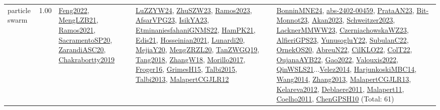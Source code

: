 {\begin{longtable}{p{3cm}r>{\raggedright\arraybackslash}p{6cm}>{\raggedright\arraybackslash}p{6cm}>{\raggedright\arraybackslash}p{8cm}}
\index{particle swarm}\index{Algorithms!particle swarm}particle swarm &  1.00 & \hyperref[detail:Feng2022]{Feng2022}, \hyperref[detail:MengLZB21]{MengLZB21}, \hyperref[detail:Ramos2021]{Ramos2021}, \hyperref[detail:SacramentoSP20]{SacramentoSP20}, \hyperref[detail:ZarandiASC20]{ZarandiASC20}, \hyperref[detail:Chakrabortty2019]{Chakrabortty2019} & \hyperref[detail:LuZZYW24]{LuZZYW24}, \hyperref[detail:ZhuSZW23]{ZhuSZW23}, \hyperref[detail:Ramos2023]{Ramos2023}, \hyperref[detail:AfsarVPG23]{AfsarVPG23}, \hyperref[detail:IsikYA23]{IsikYA23}, \hyperref[detail:EtminaniesfahaniGNMS22]{EtminaniesfahaniGNMS22}, \hyperref[detail:HamPK21]{HamPK21}, \hyperref[detail:Edis21]{Edis21}, \hyperref[detail:Hosseinian2021]{Hosseinian2021}, \hyperref[detail:Lunardi20]{Lunardi20}, \hyperref[detail:MejiaY20]{MejiaY20}, \hyperref[detail:MengZRZL20]{MengZRZL20}, \hyperref[detail:TanZWGQ19]{TanZWGQ19}, \hyperref[detail:Tang2018]{Tang2018}, \hyperref[detail:ZhangW18]{ZhangW18}, \hyperref[detail:Morillo2017]{Morillo2017}, \hyperref[detail:Froger16]{Froger16}, \hyperref[detail:GrimesH15]{GrimesH15}, \hyperref[detail:Talbi2015]{Talbi2015}, \hyperref[detail:Talbi2013]{Talbi2013}, \hyperref[detail:MalapertCGJLR12]{MalapertCGJLR12} & \hyperref[detail:BonninMNE24]{BonninMNE24}, \hyperref[detail:abs-2402-00459]{abs-2402-00459}, \hyperref[detail:PrataAN23]{PrataAN23}, \hyperref[detail:Bit-Monnot23]{Bit-Monnot23}, \hyperref[detail:Akan2023]{Akan2023}, \hyperref[detail:Schweitzer2023]{Schweitzer2023}, \hyperref[detail:LacknerMMWW23]{LacknerMMWW23}, \hyperref[detail:CzerniachowskaWZ23]{CzerniachowskaWZ23}, \hyperref[detail:AlfieriGPS23]{AlfieriGPS23}, \hyperref[detail:YunusogluY22]{YunusogluY22}, \hyperref[detail:SubulanC22]{SubulanC22}, \hyperref[detail:OrnekOS20]{OrnekOS20}, \hyperref[detail:AbreuN22]{AbreuN22}, \hyperref[detail:CilKLO22]{CilKLO22}, \hyperref[detail:ColT22]{ColT22}, \hyperref[detail:OujanaAYB22]{OujanaAYB22}, \hyperref[detail:Gao2022]{Gao2022}, \hyperref[detail:Valouxis2022]{Valouxis2022}, \hyperref[detail:QinWSLS21]{QinWSLS21}...\hyperref[detail:Velez2014]{Velez2014}, \hyperref[detail:HarjunkoskiMBC14]{HarjunkoskiMBC14}, \hyperref[detail:Wang2014]{Wang2014}, \hyperref[detail:Zhang2013]{Zhang2013}, \hyperref[detail:MalapertCGJLR13]{MalapertCGJLR13}, \hyperref[detail:Kelareva2012]{Kelareva2012}, \hyperref[detail:Deblaere2011]{Deblaere2011}, \hyperref[detail:Malapert11]{Malapert11}, \hyperref[detail:Coelho2011]{Coelho2011}, \hyperref[detail:ChenGPSH10]{ChenGPSH10} (Total: 61)\\

\end{longtable}}
